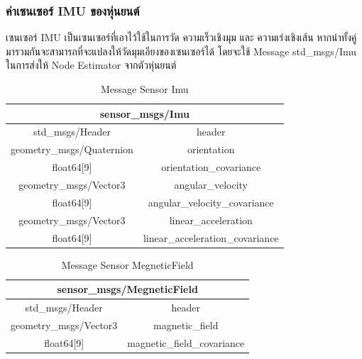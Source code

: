 \subsubsection*{ค่าเซนเซอร์ IMU ของหุ่นยนต์}
เซนเซอร์ IMU เป็นเซนเซอร์ที่เอาไว้ใช้ในการวัด ความเร็วเชิงมุม และ ความเร่งเชิงเส้น
หากนำทั้งคู่มารวมกันจะสามารถที่จะแปลงให้วัดมุมเอียงของเซนเซอร์ได้ โดยจะใช้ Message
std\_msgs/Imu ในการส่งให้ Node Estimator จากตัวหุ่นยนต์
\begin{table}[!ht]
	\centering
	\begin{tabular}{| c | c |}
		\hline
		\multicolumn{2}{|c|}{sensor\_msgs/Imu}\\
		\hline
		std\_msgs/Header & header \\
		geometry\_msgs/Quaternion & orientation \\
		float64[9] & orientation\_covariance \\
		geometry\_msgs/Vector3 & angular\_velocity \\
		float64[9] & angular\_velocity\_covariance \\
		geometry\_msgs/Vector3 & linear\_acceleration \\
		float64[9] & linear\_acceleration\_covariance \\
		\hline
	\end{tabular}
	\caption{Message Sensor Imu}
	\label{tab:sensor_imu}
\end{table}
\begin{table}[!ht]
	\centering
	\begin{tabular}{| c | c |}
		\hline
		\multicolumn{2}{|c|}{sensor\_msgs/MegneticField}\\
		\hline
		std\_msgs/Header & header \\
		geometry\_msgs/Vector3 & magnetic\_field \\
		float64[9] & magnetic\_field\_covariance \\
		\hline
	\end{tabular}
	\caption{Message Sensor MegneticField}
	\label{tab:sensor_megneticfield}
\end{table}
